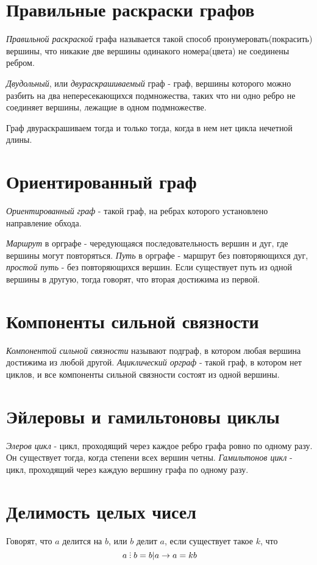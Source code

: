 \documentclass[a4paper,12pt]{article}
\newcommand{\divby}{\ \tikz \foreach \y in {0ex, 0.65ex, 1.3ex} \fill (0,\y) circle (0.5pt);\ }
\begin{document}
	\section*{Правильные раскраски графов}
	\textit{Правильной раскраской} графа называется такой способ пронумеровать(покрасить) вершины, что никакие две вершины одинакого номера(цвета) не соединены ребром.
	
	\textit{Двудольный}, или \textit{двураскрашиваемый} граф - граф, вершины которого можно разбить на два непересекающихся подмножества, таких что ни одно ребро не соединяет вершины, лежащие в одном подмножестве.
	
	Граф двураскрашиваем тогда и только тогда, когда в нем нет цикла нечетной длины.
	
	\section*{Ориентированный граф}
	\textit{Ориентированный граф} - такой граф, на ребрах которого установлено направление обхода.
	
	\textit{Маршрут} в орграфе - чередующаяся последовательность вершин и дуг, где вершины могут повторяться.
	\textit{Путь} в орграфе - маршрут без повторяющихся дуг, \textit{простой путь} - без повторяющихся вершин. Если существует путь из одной вершины в другую, тогда говорят, что вторая достижима из первой.
	
	\section*{Компоненты сильной связности}
	\textit{Компонентой сильной связности} называют подграф, в котором любая вершина достижима из любой другой.
	\textit{Ациклический орграф} - такой граф, в котором нет циклов, и все компоненты сильной связности состоят из одной вершины.
	
	\section*{Эйлеровы и гамильтоновы циклы}
	\textit{Элеров цикл} - цикл, проходящий через каждое ребро графа ровно по одному разу. Он существует тогда, когда степени всех вершин четны.
	\textit{Гамильтонов цикл} - цикл, проходящий через каждую вершину графа по одному разу.
	
	\section*{Делимость целых чисел}
	Говорят, что $a$ делится на $b$, или $b$ делит $a$, если существует такое $k$, что
	\[
	a \divby b = b | a \rightarrow a = kb
	\]
	
\end{document}

